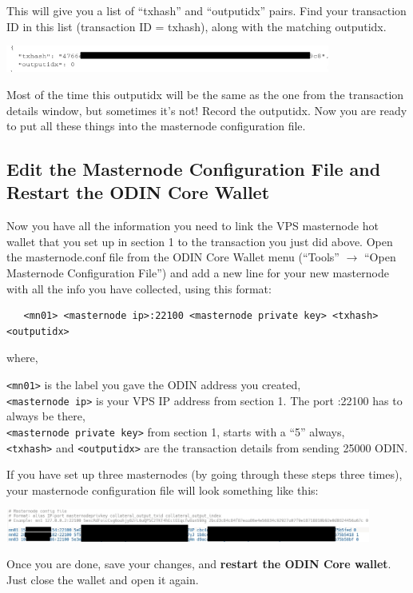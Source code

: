 \documentclass[rmp,12pt,notitlepage]{revtex4-1}
\begin{document}
This will give you a list of ``txhash'' and ``outputidx'' pairs.  Find your transaction ID in this list (transaction ID = txhash), along with the matching outputidx.  
\begin{center}
   \includegraphics[width=0.8\textwidth]{outputs}
\end{center}
Most of the time this outputidx will be the same as the one from the transaction details window, but sometimes it's not!  Record the outputidx.  Now you are ready to put all these things into the masternode configuration file.  

\subsection{Edit the Masternode Configuration File and Restart the ODIN Core Wallet}
Now you have all the information you need to link the VPS masternode hot wallet that you set up in section 1 to the transaction you just did above. Open the masternode.conf file from the ODIN Core Wallet menu (``Tools'' $\rightarrow$ ``Open Masternode Configuration File'') and add a new line for your new masternode with all the info you have collected, using this format:
\begin{verbatim}
   <mn01> <masternode ip>:22100 <masternode private key> <txhash> <outputidx>
\end{verbatim}
where,

\verb|<mn01>| is the label you gave the ODIN address you created,  \\
\verb|<masternode ip>| is your VPS IP address from section 1. The port :22100 has to always be there, \\
\verb|<masternode private key>| from section 1, starts with a ``5'' always,\\
\verb|<txhash>| and \verb|<outputidx>| are the transaction details from sending \num{25000} ODIN.

If you have set up three masternodes (by going through these steps three times), your masternode configuration file will look something like this:
\begin{center}
   \includegraphics[width=0.9\textwidth]{mnconf}
\end{center}
Once you are done, save your changes, and \textbf{restart the ODIN Core wallet}. Just close the wallet and open it again.
\end{document}
